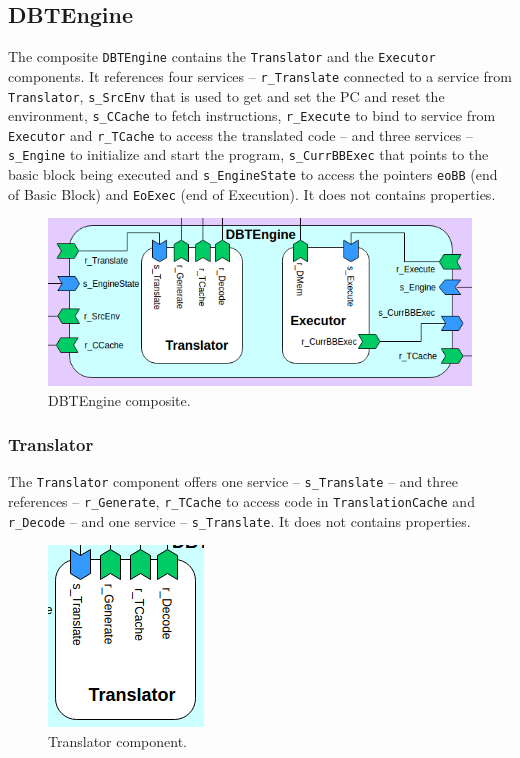 \documentclass{report}
\begin{document}
		\subsection{DBTEngine}
		
		\par The composite \texttt{DBTEngine} contains the \texttt{Translator} and the \texttt{Executor} components. It references four services -- \texttt{r\_Translate} connected to a service from \texttt{Translator}, \texttt{s\_SrcEnv} that is used to get and set the PC and reset the environment, \texttt{s\_CCache} to fetch instructions, \texttt{r\_Execute} to bind to service from \texttt{Executor} and \texttt{r\_TCache} to access the translated code -- and three services -- \texttt{s\_Engine} to initialize and start the program, \texttt{s\_CurrBBExec} that points to the basic block being executed and \texttt{s\_EngineState} to access the pointers \texttt{eoBB} (end of Basic Block) and \texttt{EoExec} (end of Execution). It does not contains properties.
		
		\begin{figure} [H]
			\centering
			\includegraphics[width=0.7\linewidth]{Images/arch-ref/DBTEngine}
			\caption{DBTEngine composite.}
			\label{fig:DBTEngine}
		\end{figure}
		
			\subsubsection{Translator}
			
			\par The \texttt{Translator} component offers one service -- \texttt{s\_Translate} -- and three references -- \texttt{r\_Generate}, \texttt{r\_TCache} to access code in \texttt{TranslationCache} and \texttt{r\_Decode} -- and one service -- \texttt{s\_Translate}. It does not contains properties. 
				
			\begin{figure} [H]
				\centering
				\includegraphics[width=0.3\linewidth]{Images/arch-ref/Translator}
				\caption{Translator component.}
				\label{fig:Translator}
			\end{figure}
			
\end{document}
